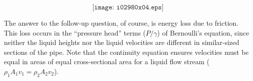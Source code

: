 $$\texttt{[image: i02980x04.eps]}$$







The answer to the follow-up question, of course, is energy loss due to friction.  This loss occurs in the ``pressure head'' terms ($P / \gamma$) of Bernoulli's equation, since neither the liquid heights nor the liquid velocities are different in similar-sized sections of the pipe.  Note that the continuity equation ensures velocities must be equal in areas of equal cross-sectional area for a liquid flow stream ($\rho_1 A_1 v_1 = \rho_2 A_2 v_2$).






